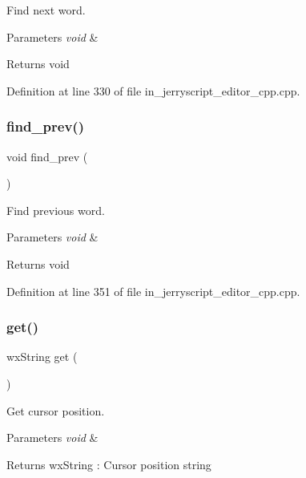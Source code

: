 Find next word. 


\begin{DoxyParams}{Parameters}
{\em void} & \\
\hline
\end{DoxyParams}
\begin{DoxyReturn}{Returns}
void 
\end{DoxyReturn}


Definition at line 330 of file in\+\_\+jerryscript\+\_\+editor\+\_\+cpp.\+cpp.

\mbox{\label{group___editor_ga376f52d4e92217aba926a0684015f610}} 
\subsubsection{find\_prev()}
{\footnotesize\ttfamily void find\+\_\+prev (\begin{DoxyParamCaption}\item[{void}]{ }\end{DoxyParamCaption})}



Find previous word. 


\begin{DoxyParams}{Parameters}
{\em void} & \\
\hline
\end{DoxyParams}
\begin{DoxyReturn}{Returns}
void 
\end{DoxyReturn}


Definition at line 351 of file in\+\_\+jerryscript\+\_\+editor\+\_\+cpp.\+cpp.

\mbox{\label{group___editor_gad833fe8055e535b4696cfc376a286f80}} 
\subsubsection{get()}
{\footnotesize\ttfamily wx\+String get (\begin{DoxyParamCaption}\item[{void}]{ }\end{DoxyParamCaption})}



Get cursor position. 


\begin{DoxyParams}{Parameters}
{\em void} & \\
\hline
\end{DoxyParams}
\begin{DoxyReturn}{Returns}
wx\+String \+: Cursor position string 
\end{DoxyReturn}


